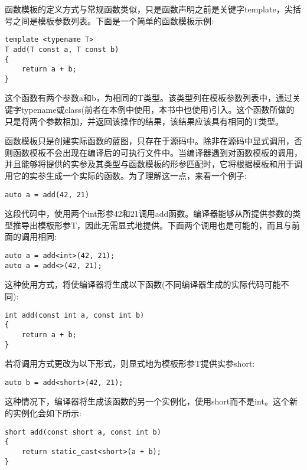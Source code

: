函数模板的定义方式与常规函数类似，只是函数声明之前是关键字template，尖括号之间是模板参数列表。下面是一个简单的函数模板示例:

\begin{lstlisting}[style=styleCXX]
template <typename T>
T add(T const a, T const b)
{
	return a + b;
}
\end{lstlisting}

这个函数有两个参数a和b，为相同的T类型。该类型列在模板参数列表中，通过关键字typename或class(前者在本例中使用，本书中也使用)引入。这个函数所做的只是将两个参数相加，并返回该操作的结果，该结果应该具有相同的T类型。

函数模板只是创建实际函数的蓝图，只存在于源码中。除非在源码中显式调用，否则函数模板不会出现在编译后的可执行文件中。当编译器遇到对函数模板的调用，并且能够将提供的实参及其类型与函数模板的形参匹配时，它将根据模板和用于调用它的实参生成一个实际的函数。为了理解这一点，来看一个例子:

\begin{lstlisting}[style=styleCXX]
auto a = add(42, 21)
\end{lstlisting}

这段代码中，使用两个int形参42和21调用add函数。编译器能够从所提供参数的类型推导出模板形参T，因此无需显式地提供。下面两个调用也是可能的，而且与前面的调用相同:

\begin{lstlisting}[style=styleCXX]
auto a = add<int>(42, 21);
auto a = add<>(42, 21);
\end{lstlisting}

这种使用方式，将使编译器将生成以下函数(不同编译器生成的实际代码可能不同):

\begin{lstlisting}[style=styleCXX]
int add(const int a, const int b)
{
	return a + b;
}
\end{lstlisting}

若将调用方式更改为以下形式，则显式地为模板形参T提供实参short:

\begin{lstlisting}[style=styleCXX]
auto b = add<short>(42, 21);
\end{lstlisting}

这种情况下，编译器将生成该函数的另一个实例化，使用short而不是int。这个新的实例化会如下所示:

\begin{lstlisting}[style=styleCXX]
short add(const short a, const int b)
{
	return static_cast<short>(a + b);
}
\end{lstlisting}

